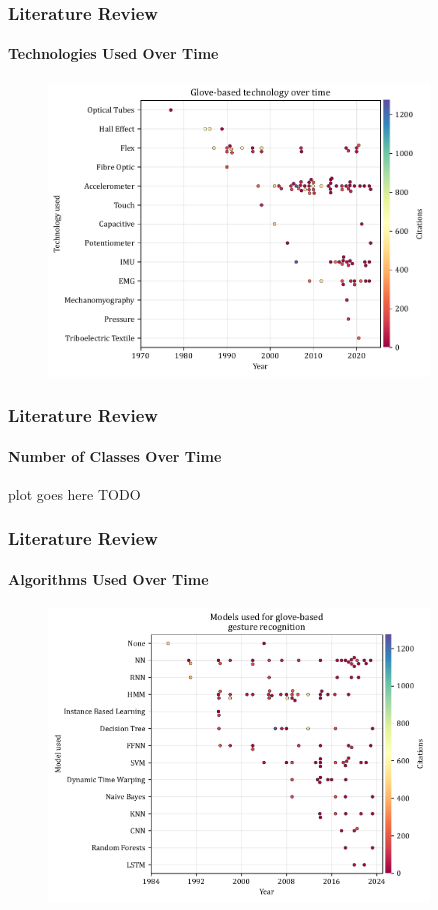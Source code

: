 \documentclass[xcolor={svgnames,table},10pt,fleqn]{beamer}
\begin{document}
\begin{frame}
    \frametitle{Literature Review}
    \framesubtitle{Technologies Used Over Time}
    \begin{figure}
        \includegraphics[width=0.9\textwidth]{imgs/03_tech_for_gloves.pdf}
    \end{figure}
\end{frame}

\begin{frame}
    \frametitle{Literature Review}
    \framesubtitle{Number of Classes Over Time}
    plot goes here
    TODO
\end{frame}

\begin{frame}
    \frametitle{Literature Review}
    \framesubtitle{Algorithms Used Over Time}
    \begin{figure}
        \includegraphics[width=0.9\textwidth]{imgs/03_models_glove_based.pdf}
    \end{figure}
\end{frame}
\end{document}
